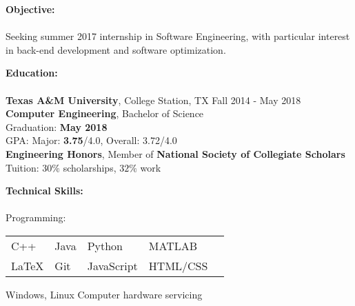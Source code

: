 \documentclass[12pt]{article}
\begin{document}
\begin{flushleft}
\begin{outline}[compactitem]

\newcommand{\upspace}{\vspace{-1.5px}}
\newcommand{\zzz}[1]{\upspace \0 \textbf{#1} \\ \vspace{-0.8\baselineskip} \hrulefill \vspace{-2px} \\ }
\renewcommand\labelitemii{\labelitemi}
\let\oldOne\1\let\oldTwo\2\let\oldThree\3\let\oldFour\4
\renewcommand{\1}{\upspace \oldOne  }
\renewcommand{\2}{\upspace \oldTwo  }
\renewcommand{\3}{\upspace \oldThree}
\renewcommand{\4}{\upspace \oldFour }




\zzz{Objective:}
  \1 Seeking summer 2017 internship in Software Engineering, with particular interest in back-end development and software optimization.

\zzz{Education:}
  \1 \textbf{Texas A\&M University}, College Station, TX \hfill Fall 2014 - May 2018
  \\ \textbf{Computer Engineering}, Bachelor of Science
  \\ Graduation: \textbf{May 2018}
  \\ GPA:  Major: \textbf{3.75}/4.0, Overall: 3.72/4.0
  \\ \textbf{Engineering Honors}, Member of \textbf{National Society of Collegiate Scholars}
  \\ Tuition: $30\%$ scholarships, $32\%$ work

\zzz{Technical Skills:}
  \1 Programming:
    \begin{tabularx}{\textwidth}{X X X X X}
      C++    & Java  & Python      & MATLAB   \upspace \\
      LaTeX  & Git   & JavaScript  & HTML/CSS \upspace \\
    \end{tabularx}
    \vspace{-5px}\upspace
  \1 
    Windows, Linux
    \hfill{}\hspace{1px}
    Computer hardware servicing
    \hfill
    \hfill


\end{outline}
\end{flushleft}
\end{document}
